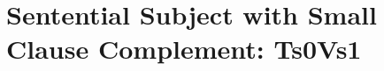   
 
 
 
        
 
 
 
\section{Sentential Subject with Small Clause Complement: Ts0Vs1} 
\label{s0Vs1-family} 
 
